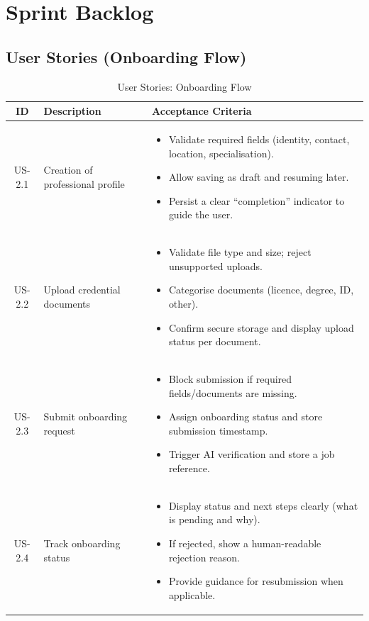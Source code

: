 \documentclass[a4paper,12pt]{report}
\renewcommand{\arraystretch}{1.25}
\begin{document}
\section{Sprint Backlog}
\label{sec:sprint2-backlog}

\renewcommand{\arraystretch}{1.4}

\subsection{User Stories (Onboarding Flow)}
\begin{table}[H]
\centering
\begin{tabularx}{\textwidth}{|c|X|X|}
\hline
\rowcolor{medgray}
\textbf{ID} & \textbf{Description} & \textbf{Acceptance Criteria} \\
\midrule
\hline

US-2.1 & Creation of professional profile &
\begin{itemize}[leftmargin=*]
\item Validate required fields (identity, contact, location, specialisation).
\item Allow saving as draft and resuming later.
\item Persist a clear ``completion'' indicator to guide the user.
\end{itemize} \\ \hline

US-2.2 & Upload credential documents &
\begin{itemize}[leftmargin=*]
\item Validate file type and size; reject unsupported uploads.
\item Categorise documents (licence, degree, ID, other).
\item Confirm secure storage and display upload status per document.
\end{itemize} \\ \hline

US-2.3 & Submit onboarding request &
\begin{itemize}[leftmargin=*]
\item Block submission if required fields/documents are missing.
\item Assign onboarding status and store submission timestamp.
\item Trigger AI verification and store a job reference.
\end{itemize} \\ \hline

US-2.4 & Track onboarding status &
\begin{itemize}[leftmargin=*]
\item Display status and next steps clearly (what is pending and why).
\item If rejected, show a human-readable rejection reason.
\item Provide guidance for resubmission when applicable.
\end{itemize} \\ \hline

\end{tabularx}
\caption{User Stories: Onboarding Flow}
\end{table}
\end{document}
